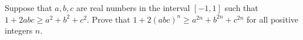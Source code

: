 Suppose that \(a,b,c\) are real numbers in the interval \([-1,1]\) such that \(1 + 2abc \geq a^2+b^2+c^2\). Prove that
\(1+2(abc)^n \geq a^{2n} + b^{2n} + c^{2n}\) for all positive integers \(n\).